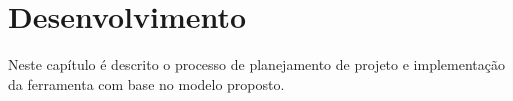 \chapter{Desenvolvimento}

Neste capítulo é descrito o processo de planejamento de projeto e implementação da ferramenta com base no modelo proposto.



